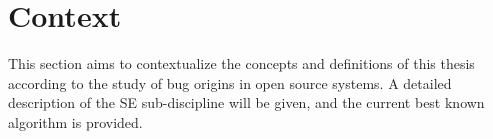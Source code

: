\documentclass[a4paper, 12pt]{book}
\begin{document}






\section{Context}
\label{sec:context}

This section aims to contextualize the concepts and definitions of this thesis according to the study of bug origins in open source systems. A detailed description of the SE sub-discipline will be given, and the current best known algorithm is provided.
\end{document}
